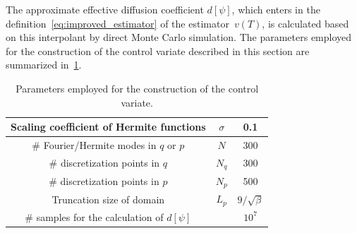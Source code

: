 \documentclass[11pt,a4paper]{article}
\theoremstyle{plain}
\numberwithin{equation}{section}
\begin{document}
The approximate effective diffusion coefficient $d[\psi]$,
which enters in the definition~\eqref{eq:improved_estimator} of the estimator~$v(T)$,
is calculated based on this interpolant by direct Monte Carlo simulation.
The parameters employed for the construction of the control variate described in this section are summarized in~\cref{table:parameters_employed_for_the_construction_of_the_control_variate}.
\begin{table}[ht]
    \centering
    \begin{tabular}{|c|c|c|}
        \hline
        Scaling coefficient of Hermite functions & $\sigma$ & 0.1 \\
        \hline
        \# Fourier/Hermite modes in $q$ or $p$ & $N$ & 300 \\
        \hline
        \# discretization points in $q$ & $N_q$ & 300 \\
        \hline
        \# discretization points in $p$ & $N_p$ & 500 \\
        \hline
        Truncation size of domain & $L_p$ & $9/\sqrt{\beta}$\\
        \hline
        \# samples for the calculation of $d[\psi]$ & & $10^7$ \\
        \hline
    \end{tabular}
    \caption{Parameters employed for the construction of the control variate.}
    \label{table:parameters_employed_for_the_construction_of_the_control_variate}
\end{table}
\end{document}
